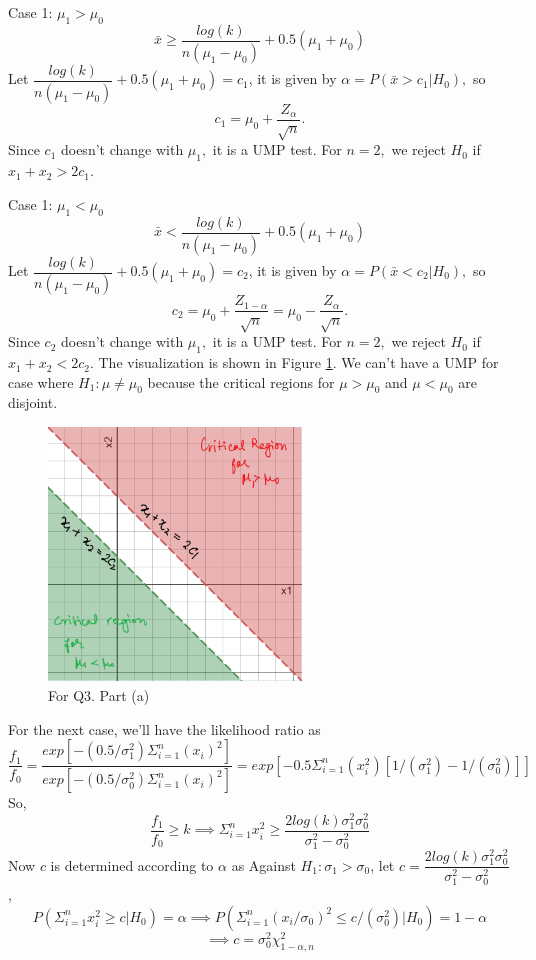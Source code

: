 \documentclass[12pt, oneside]{article}
\begin{document}
\begin{enumerate}
Case 1: $\mu_1 > \mu_0$
$$
\bar{x} \ge \dfrac{log(k)}{n(\mu_1 - \mu_0)} + 0.5(\mu_1 + \mu_0)
$$
Let $\dfrac{log(k)}{n(\mu_1 - \mu_0)} + 0.5(\mu_1 + \mu_0) = c_1$, it is given by
$\alpha = P(\bar{x} > c_1 | H_0),$ so
$$
c_1 = \mu_0 + \dfrac{Z_{\alpha}}{\sqrt{n}}.$$
Since $c_1$ doesn't change with $\mu_1,$ it is a UMP test. 
For $n=2,$ we reject $H_0$ if $x_1 + x_2 > 2c_1$. 

Case 1: $\mu_1 < \mu_0$
$$
\bar{x} < \dfrac{log(k)}{n(\mu_1 - \mu_0)} + 0.5(\mu_1 + \mu_0)
$$
Let $\dfrac{log(k)}{n(\mu_1 - \mu_0)} + 0.5(\mu_1 + \mu_0) = c_2$, it is given by
$\alpha = P(\bar{x} < c_2 | H_0),$ so
$$
c_2 = \mu_0 + \dfrac{Z_{1-\alpha}}{\sqrt{n}} = \mu_0 - \dfrac{Z_{\alpha}}{\sqrt{n}}.$$
Since $c_2$ doesn't change with $\mu_1,$ it is a UMP test. 
For $n=2,$ we reject $H_0$ if $x_1 + x_2 < 2c_2$. 
The visualization is shown in Figure \ref{fig:q3}. 
We can't have a UMP for case where $H_1 : \mu \neq \mu_0$ because the critical regions for $\mu > \mu_0$ and $\mu < \mu_0$ are disjoint. 

\begin{figure}[!ht]
    \centering
    \includegraphics[width=0.6\textwidth]{desmos-graph.png}
    \caption{\label{fig:q3} For Q3. Part (a)}
\end{figure}

For the next case, we'll have the likelihood ratio as 
$$
\dfrac{f_1}{f_0} = \dfrac{exp[-(0.5/\sigma_1^2)\Sigma_{i=1}^{n} (x_i)^2]}{exp[-(0.5/\sigma_0^2)\Sigma_{i=1}^{n} (x_i)^2]} = exp[-0.5\Sigma_{i=1}^{n}(x_i^2) [1/(\sigma_1^2)-1/(\sigma_0^2)]]
$$
So,
$$
\dfrac{f_1}{f_0} \ge k \implies \Sigma_{i=1}^{n} x_i^2 \ge \dfrac{2log(k)\sigma_1^2\sigma_0^2}{\sigma_1^2 - \sigma_0^2} 
$$
Now $c$ is determined according to $\alpha$ as 
\newline Against $H_1: \sigma_1 > \sigma_0$, let $c = \dfrac{2log(k)\sigma_1^2\sigma_0^2}{\sigma_1^2 - \sigma_0^2}$,
$$
P(\Sigma_{i=1}^{n} x_i^2 \ge c | H_0) = \alpha \implies P(\Sigma_{i=1}^{n} (x_i/\sigma_0)^2 \le c/(\sigma_0^2) | H_0) = 1-\alpha
$$
$$
\implies c = \sigma_0^2 \chi_{1-\alpha,n}^2
$$


\end{enumerate}
\end{document}
